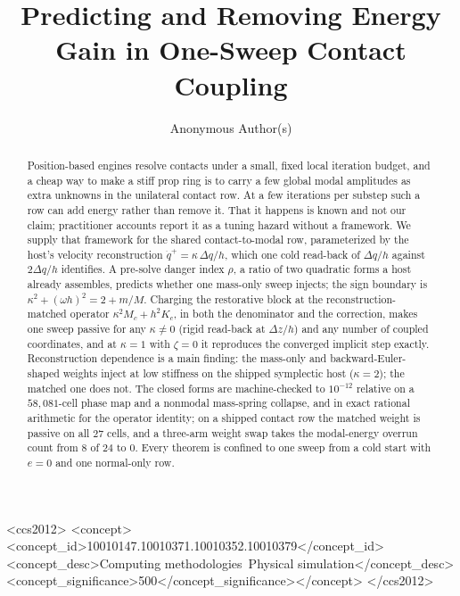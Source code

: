 \documentclass[sigconf,screen,review,anonymous]{acmart}
\newcommand{\oh}{\omega h}
\theoremstyle{acmdefinition}
\begin{document}
\title[Predicting and Removing Energy Gain in One-Sweep Contact Coupling]{%
  Predicting and Removing Energy Gain in One-Sweep Contact Coupling}

\author{Anonymous Author(s)}

\begin{abstract}
Position-based engines resolve contacts under a small, fixed local
iteration budget, and a cheap way to make a stiff prop ring is to carry a few
global modal amplitudes as extra unknowns in the unilateral contact row. At a few
iterations per substep such a row can add energy rather than remove it. That
it happens is known and not our claim; practitioner accounts
report it as a tuning hazard without a framework. We supply that framework for
the shared contact-to-modal row, parameterized by the host's velocity
reconstruction
$\dot q^{+} = \kappa\,\Delta q/h$, which one cold read-back of $\Delta q/h$
against $2\Delta q/h$ identifies. A pre-solve danger index $\rho$, a ratio of two
quadratic forms a host already assembles, predicts whether one mass-only sweep
injects; the sign boundary is $\kappa^2 + (\oh)^2 = 2 + m/M$. Charging the
restorative block at the reconstruction-matched operator $\kappa^2 M_c + h^2 K_c$,
in both the denominator and the correction, makes one sweep
passive for any $\kappa \neq 0$ (rigid read-back at $\Delta z/h$) and any number
of coupled coordinates, and at
$\kappa = 1$ with $\zeta = 0$ it reproduces the converged implicit
step exactly.
Reconstruction dependence is a main finding: the mass-only and
backward-Euler-shaped weights inject at low stiffness on the shipped symplectic
host ($\kappa = 2$); the matched one does not. The closed forms are machine-checked
to $10^{-12}$ relative on a $58{,}081$-cell phase map and a nonmodal mass-spring
collapse, and in exact rational arithmetic for the operator identity; on a
shipped contact row the matched weight is passive on all $27$ cells, and a
three-arm weight swap takes the modal-energy overrun count from $8$ of $24$
to $0$. Every
theorem is confined to one sweep from a cold start with $e = 0$ and one
normal-only row.
\end{abstract}

\begin{CCSXML}
<ccs2012>
<concept><concept_id>10010147.10010371.10010352.10010379</concept_id>
<concept_desc>Computing methodologies~Physical simulation</concept_desc>
<concept_significance>500</concept_significance></concept>
</ccs2012>
\end{CCSXML}
\end{document}
